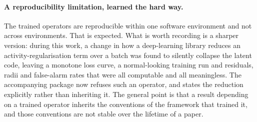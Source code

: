 \documentclass[a4paper]{cas-sc}
\begin{document}
\paragraph{A reproducibility limitation, learned the hard way.}
The trained operators are reproducible within one software environment and not
across environments. That is expected. What is worth recording is a sharper
version: during this work, a change in how a deep-learning library reduces an
activity-regularisation term over a batch was found to silently collapse the
latent code, leaving a monotone loss curve, a normal-looking training run and
residuals, radii and false-alarm rates that were all computable and all
meaningless. The accompanying package now refuses such an operator, and states
the reduction explicitly rather than inheriting it. The general point is that
a result depending on a trained operator inherits the conventions of the
framework that trained it, and those conventions are not stable over the
lifetime of a paper.
\end{document}
